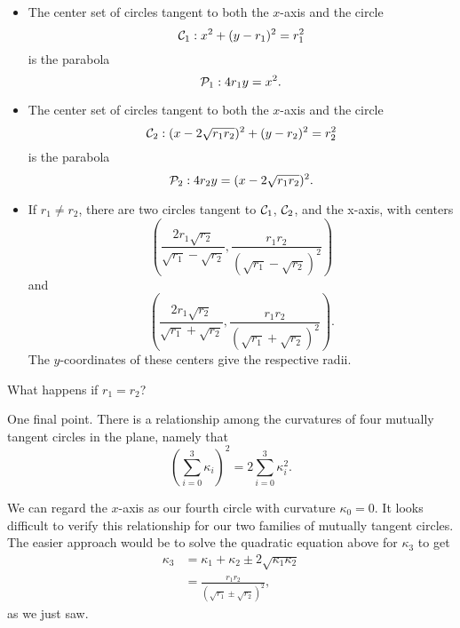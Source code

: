 \documentclass{ximera}
\newcommand{\pskip}{\vskip 0.1 in}
\begin{document}
\begin{itemize}
\item{The center set of circles tangent to both the $x$-axis and the circle
\[
     {\cal C}_1: x^2 + (y-r_1)^2 = r_1^2
\] 
is the parabola
\[
    {\cal P}_1: 4r_1 y = x^2 .
\]
}

\item{The center set of circles tangent to both the $x$-axis and the circle
\[
     {\cal C}_2: (x-2\sqrt{r_1r_2})^2 + (y-r_2)^2 = r_2^2
\] 
is the parabola
\[
    {\cal P}_2: 4r_2 y = (x-2\sqrt{r_1r_2})^2 .
\]
}

\item{If $r_1\neq r_2$, there are two circles tangent to ${\cal C}_1$, ${\cal C}_2$, and the x-axis, with centers
\[
      \left( \frac{2r_1\sqrt{r_2}}{\sqrt{r_1} -\sqrt{r_2}} , \frac{r_1 r_2}{(\sqrt{r_1} -\sqrt{r_2})^2}  \right) 
\]
and
\[
      \left( \frac{2r_1\sqrt{r_2}}{\sqrt{r_1} +\sqrt{r_2}} , \frac{r_1 r_2}{(\sqrt{r_1} +\sqrt{r_2})^2}  \right) .
\]
The $y$-coordinates of these centers give the respective radii.
}
\end{itemize}


\begin{question} \label{Q43ttgt:Spheres}
What happens if $r_1=r_2$?
\end{question}

One final point. There is a relationship among the curvatures of four mutually tangent circles in the plane, namely that
\[
    \left( \sum_{i=0}^3 \kappa_i \right)^2 = 2 \sum_{i=0}^3 \kappa_i^2 .     \label{Eq:Q1TangentSpheres}
\]






We can regard the $x$-axis as our fourth circle with curvature $\kappa_0 = 0$. It looks difficult to verify this relationship for our two families of mutually tangent circles. The easier approach would be to solve the quadratic equation above for $\kappa_3$ to get
\begin{align*}
   \kappa_3   &= \kappa_1 + \kappa_2 \pm 2\sqrt{\kappa_1\kappa_2}  \\
                   &= \frac{r_1 r_2}{(\sqrt{r_1} \pm\sqrt{r_2})^2} ,
\end{align*}
as we just saw.
\end{document}
